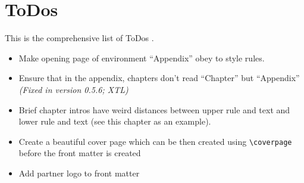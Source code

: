 \section{ToDos}

This is the comprehensive list of ToDos .

\begin{itemize}
    \item Make opening page of environment ``Appendix'' obey to style rules.
    \item Ensure that in the appendix, chapters don't read ``Chapter'' but ``Appendix'' \textsl{(Fixed in version 0.5.6; XTL)}
    \item Brief chapter intros have weird distances between upper rule and text and lower rule and text (see this chapter as an example).
    \item Create a beautiful cover page which can be then created using \lstinline!\coverpage! before the front matter is created
    \item Add partner logo to front matter
\end{itemize}


